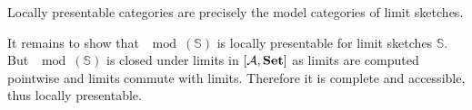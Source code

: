 \begin{Corollary}
Locally presentable categories are precisely the model categories of limit sketches.
\end{Corollary}
\begin{Proof}
It remains to show that $\mod(\mathbb S)$ is locally presentable for limit sketches $\mathbb S$. But $\mod(\mathbb S)$ is closed under limits in $[\mathcal{A},\mathbf{Set}]$ as limits are computed pointwise and limits commute with limits. Therefore it is complete and accessible, thus locally presentable.
\end{Proof}